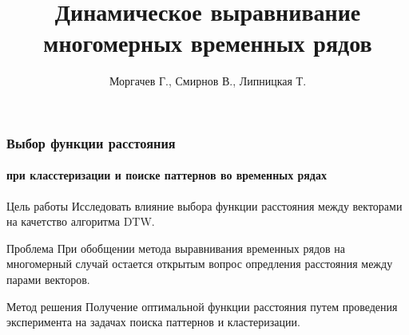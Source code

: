 \documentclass{beamer}
\title[\hbox to 56mm{DTW  \hfill\insertframenumber\,/\,\inserttotalframenumber}]
{Динамическое выравнивание многомерных временных рядов}
\author{Моргачев Г., Смирнов В., Липницкая Т.}
\institute{Московский физико-технический институт}
\date{\footnotesize{
\par\emph{Курс:} Автоматизация научных исследований в машинном обучении\par (практика, В.В. Стрижов)/2019
\par\emph{Консультант:} Гончаров А.
\date{\today}
}}
\begin{document}

\begin{frame}
\titlepage 
\end{frame}


\begin{frame}
\frametitle{Выбор функции расстояния}
\framesubtitle{при класстеризации и поиске паттернов во временных рядах}
    \begin{block}{Цель работы}
        Исследовать влияние выбора функции расстояния между векторами на 
        качетство алгоритма DTW.
    \end{block}
    \begin{block}{Проблема}
        При обобщении метода выравнивания временных рядов на многомерный случай остается 
        открытым вопрос опредления расстояния между парами векторов.
    \end{block}
    \begin{block}{Метод решения}
        Получение оптимальной функции расстояния путем проведения эксперимента на 
        задачах поиска паттернов и кластеризации.
    \end{block}
\end{frame}
\end{document}
